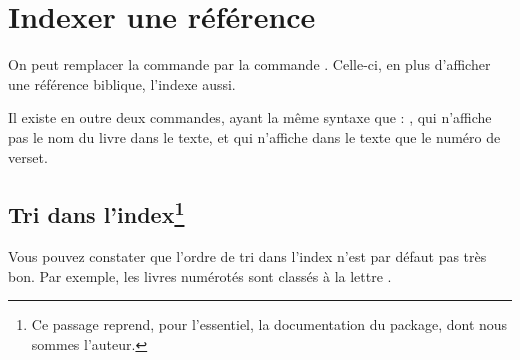 \section{Indexer une référence}

On peut remplacer la commande  par la commande . Celle-ci, en plus d'afficher une référence biblique, l'indexe aussi.

Il existe en outre deux commandes, ayant la même syntaxe que  : , qui n'affiche pas le nom du livre dans le texte, et  qui n'affiche dans le texte que le numéro de verset.

\subsection[Tri dans l'index]{Tri dans l'index\footnote{Ce passage reprend, pour l'essentiel, la documentation du package, dont nous sommes l'auteur.}}

Vous pouvez constater que l'ordre de tri dans l'index n'est par défaut pas très bon. Par exemple, les livres numérotés sont classés à la lettre . 

